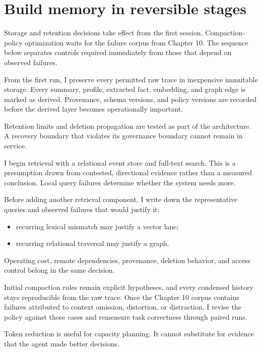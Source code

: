 \section{Build memory in reversible stages}\label{build-memory-in-reversible-stages}

Storage and retention decisions take effect from the first session. Compaction-policy optimization waits for the failure corpus from Chapter 10. The sequence below separates controls required immediately from those that depend on observed failures.

From the first run, I preserve every permitted raw trace in inexpensive immutable storage. Every summary, profile, extracted fact, embedding, and graph edge is marked as derived. Provenance, schema versions, and policy versions are recorded before the derived layer becomes operationally important.

Retention limits and deletion propagation are tested as part of the architecture. A recovery boundary that violates its governance boundary cannot remain in service.

I begin retrieval with a relational event store and full-text search. This is a presumption drawn from contested, directional evidence rather than a measured conclusion. Local query failures determine whether the system needs more.

Before adding another retrieval component, I write down the representative queries and observed failures that would justify it:

\begin{itemize}
\tightlist
\item
  recurring lexical mismatch may justify a vector lane;
\item
  recurring relational traversal may justify a graph.
\end{itemize}

Operating cost, remote dependencies, provenance, deletion behavior, and access control belong in the same decision.

Initial compaction rules remain explicit hypotheses, and every condensed history stays reproducible from the raw trace. Once the Chapter 10 corpus contains failures attributed to context omission, distortion, or distraction, I revise the policy against those cases and remeasure task correctness through paired runs.

Token reduction is useful for capacity planning. It cannot substitute for evidence that the agent made better decisions.


